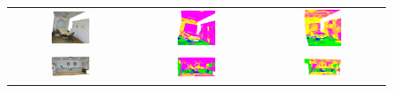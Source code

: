 \begin{figure}[h!]
\begin{tabular}{ccc}
            \includegraphics[width=0.33\textwidth, height=0.18\textheight]{images/seg_output/s3dis_DE/S3DIS_2_RGB.png} &
            \includegraphics[width=0.33\textwidth, height=0.18\textheight]{images/seg_output/s3dis_DE/S3DIS_2_Pred.png}&
            \includegraphics[width=0.33\textwidth, height=0.18\textheight]{images/seg_output/s3dis_DE/ocroom_1.png} \\
            
            \includegraphics[width=0.33\textwidth, height=0.18\textheight]{images/seg_output/s3dis_DE/S3DIS_3_RGB.png} &
            \includegraphics[width=0.33\textwidth, height=0.18\textheight]{images/seg_output/s3dis_DE/S3DIS_3_Pred.png}&
            \includegraphics[width=0.33\textwidth, height=0.18\textheight]{images/seg_output/s3dis_DE/opantry_1.png} \\


\end{tabular}
\end{figure}
